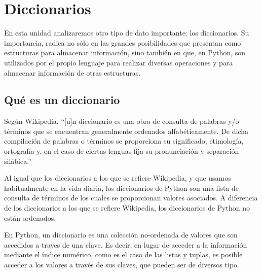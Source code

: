 
%

\chapter{Diccionarios}

En esta unidad analizaremos otro tipo de dato importante: los diccionarios.
Su importancia, radica no sólo en las grandes posibilidades que presentan
como estructuras para almacenar información, sino también en que, en
Python, son utilizados por el propio lenguaje para realizar diversas
operaciones y para almacenar información de otras estructuras.

\section{Qué es un diccionario}

Según Wikipedia, ``[u]n diccionario es una obra de consulta de
palabras y/o términos que se encuentran generalmente ordenados
alfabéticamente. De dicha compilación de palabras o términos se
proporciona su significado, etimología, ortografía y, en el caso
de ciertas lenguas fija su pronunciación y separación silábica.''


Al igual que los diccionarios a los que se refiere Wikipedia, y
que usamos habitualmente en la vida diaria, los diccionarios de
Python son una lista de consulta de términos de los cuales se
proporcionan valores asociados. A diferencia de los diccionarios a
los que se refiere Wikipedia, los diccionarios de Python no están
ordenados.


En Python, un diccionario es una colección no-ordenada de valores
que son accedidos a traves de una clave.  Es decir, en lugar de
acceder a la información mediante el índice numérico, como es el
caso de las listas y tuplas, es posible acceder a los valores a
través de sus claves, que pueden ser de diversos tipo.

